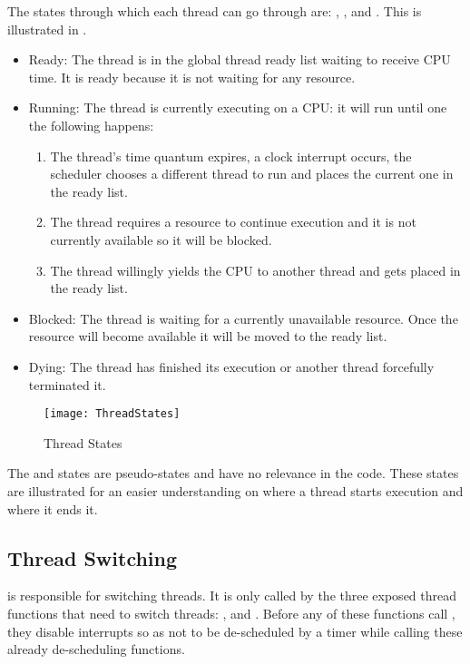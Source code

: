 \begin{appendices}
The states through which each thread can go through are: , ,
 and . This is illustrated in .
\begin{itemize}
	\item Ready: The thread is in the global thread ready list waiting to receive CPU time. It is
	ready because it is not waiting for any resource.
	\item Running: The thread is currently executing on a CPU: it will run until one the following
	happens:
		\begin{enumerate}
			\item The thread's time quantum expires, a clock interrupt occurs, the scheduler
			chooses a different thread to run and places the current one in the ready list.
			\item The thread requires a resource to continue execution and it is not currently
			available so it will be blocked.
			\item The thread willingly yields the CPU to another thread and gets placed in the ready
			list.
		\end{enumerate}
	\item Blocked: The thread is waiting for a currently unavailable resource. Once the resource
	will become available it will be moved to the ready list.
	\item Dying: The thread has finished its execution or another thread forcefully terminated it.
\end{itemize}

\begin{figure}
	\centering
	\texttt{[image: ThreadStates]}
		\caption{Thread States}
	\label{fig:ThreadStates}
\end{figure}

The  and  states are pseudo-states and have no relevance in the
code. These states are illustrated for an easier understanding on where a thread starts execution
and where it ends it.

\subsection{Thread Switching} 
\label{sect:ThreadSwitch}

 is responsible for switching threads. It is only called by the three exposed
thread functions that need to switch threads: ,  and
. Before any of these functions call , they disable
interrupts so as not to be de-scheduled by a timer while calling these already de-scheduling
functions.


\end{appendices}
